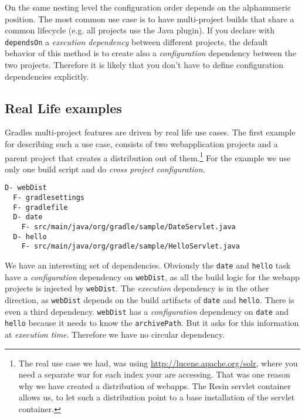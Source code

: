 On the same nesting level the configuration order depends on the alphanumeric position. The most common use case is to have multi-project builds that share a common lifecycle (e.g. all projects use the Java plugin). If you declare with \texttt{dependsOn} a \emph{execution dependency} between different projects, the default behavior of this method is to create also a \emph{configuration} dependency between the two projects. Therefore it is likely that you don't have to define configuration dependencies explicitly. 

\subsection{Real Life examples} %
\label{sub:real_life_examples}
Gradles multi-project features are driven by real life use cases. The first example for describing such a use case, consists of two webapplication projects and a parent project that creates a distribution out of them.\footnote{The real use case we had, was using \url{http://lucene.apache.org/solr}, where you need a separate war for each index your are accessing. That was one reason why we have created a distribution of webapps. The Resin servlet container allows us, to let such a distribution point to a base installation of the servlet container.} For the example we use only one build script and do \emph{cross project configuration}.
\begin{Verbatim}[frame=single,label=Project Tree]
D- webDist
  F- gradlesettings
  F- gradlefile
  D- date
    F- src/main/java/org/gradle/sample/DateServlet.java
  D- hello
    F- src/main/java/org/gradle/sample/HelloServlet.java
\end{Verbatim}
We have an interesting set of dependencies. Obviously the \texttt{date} and \texttt{hello} task have a \emph{configuration} dependency on \texttt{webDist}, as all the build logic for the webapp projects is injected by \texttt{webDist}. The \emph{execution} dependency is in the other direction, as \texttt{webDist} depends on the build artifacts of \texttt{date} and \texttt{hello}. There is even a third dependency. \texttt{webDist} has a \emph{configuration} dependency on \texttt{date} and \texttt{hello} because it needs to know the \texttt{archivePath}. But it asks for this information at \emph{execution time}. Therefore we have no circular dependency.

